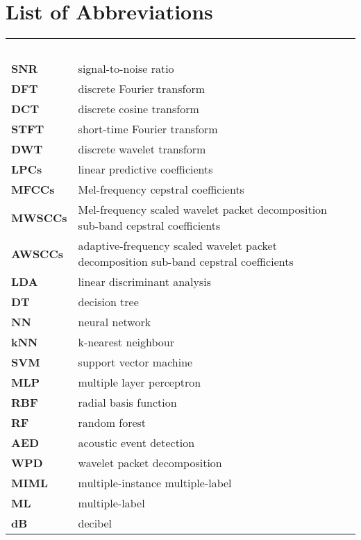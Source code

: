 

\chapter*{List of Abbreviations}


\renewcommand{\arraystretch}{1.4} 
\begin{longtable}{llr}
\multicolumn{3}{l}{\textbf{}\hspace{0.4\textwidth}~~}\\
\textbf{SNR}   &     signal-to-noise ratio\\
\textbf{DFT}   &                    discrete Fourier transform \\
\textbf{DCT}    &                    discrete cosine transform \\
\textbf{STFT} & short-time Fourier transform \\
\textbf{DWT}   & discrete wavelet transform \\
\textbf{LPCs}	 &                   linear predictive coefficients \\
\textbf{MFCCs} &	       Mel-frequency cepstral coefficients \\
\textbf{MWSCCs} & Mel-frequency scaled wavelet packet decomposition sub-band cepstral coefficients \\
\textbf{AWSCCs} & adaptive-frequency scaled wavelet packet decomposition sub-band cepstral coefficients \\
\textbf{LDA}      &                  linear discriminant analysis \\
\textbf{DT}     &                  decision tree                       \\
\textbf{NN}     &    neural network  \\
\textbf{kNN}	  &                  k-nearest neighbour \\
\textbf{SVM}	     &               support vector machine \\
\textbf{MLP}    &                   multiple layer perceptron \\
\textbf{RBF}    &                   radial basis function \\
\textbf{RF}     &                      random forest \\
\textbf{AED}	   &                 acoustic event detection \\
\textbf{WPD}     &                 wavelet packet decomposition \\
\textbf{MIML}   &                 multiple-instance multiple-label  \\ 
\textbf{ML}    &                      multiple-label \\
\textbf{dB}    &                      decibel \\
\end{longtable}

